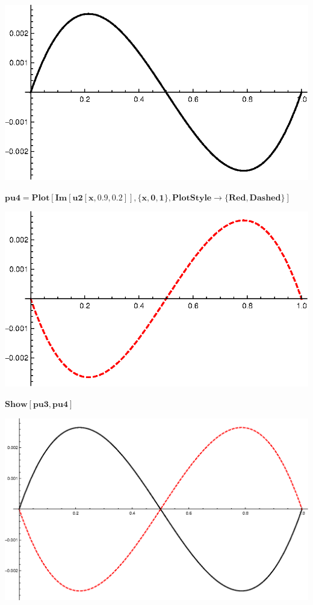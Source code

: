 {\includegraphics{chapters/appendices/KP_Mathematica/Kronig_Penney_model_transfer_matrix_gr11.eps}

\begin{doublespace}
\noindent\(\pmb{\text{pu4}=\text{Plot}[\text{Im}[\text{u2}[x,0.9,0.2]],\{x,0,1\},\text{PlotStyle}\to \{\text{Red},\text{Dashed}\}]}\)
\end{doublespace}

\includegraphics{chapters/appendices/KP_Mathematica/Kronig_Penney_model_transfer_matrix_gr12.eps}

\begin{doublespace}
\noindent\(\pmb{\text{Show}[\text{pu3},\text{pu4}]}\)
\end{doublespace}

\includegraphics{chapters/appendices/KP_Mathematica/Kronig_Penney_model_transfer_matrix_gr13.eps}

}
